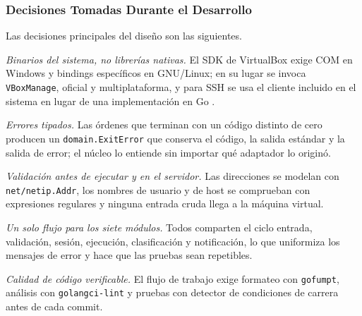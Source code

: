 \subsubsection{Decisiones Tomadas Durante el Desarrollo}
\label{sec:decisiones}

Las decisiones principales del diseño son las siguientes.

\emph{Binarios del sistema, no librerías nativas.} El SDK de VirtualBox
exige COM en Windows y bindings específicos en GNU/Linux; en su lugar se
invoca \texttt{VBoxManage}, oficial y multiplataforma, y para SSH se usa
el cliente incluido en el sistema en lugar de una implementación en Go
\parencite{donovan}.

\emph{Errores tipados.} Las órdenes que terminan con un código distinto
de cero producen un \texttt{domain.ExitError} que conserva el código, la
salida estándar y la salida de error; el núcleo lo entiende sin importar
qué adaptador lo originó.

\emph{Validación antes de ejecutar y en el servidor.} Las direcciones se
modelan con \texttt{net/netip.Addr}, los nombres de usuario y de host se
comprueban con expresiones regulares y ninguna entrada cruda llega a la
máquina virtual.

\emph{Un solo flujo para los siete módulos.} Todos comparten el ciclo
entrada, validación, sesión, ejecución, clasificación y notificación, lo
que uniformiza los mensajes de error y hace que las pruebas sean
repetibles.

\emph{Calidad de código verificable.} El flujo de trabajo exige
formateo con \texttt{gofumpt}, análisis con \texttt{golangci-lint} y
pruebas con detector de condiciones de carrera antes de cada commit.

\FloatBarrier
